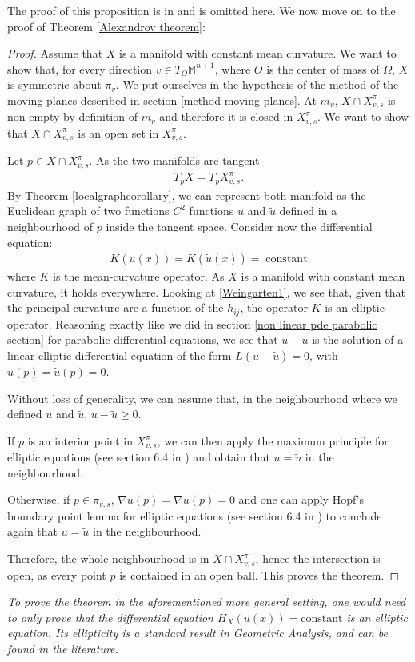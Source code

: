 The proof of this proposition is in \cite{italiani} and is omitted here. We now move on to the proof of Theorem \ref{Alexandrov theorem}:
\begin{proof}
	Assume that $X$ is a manifold with constant mean curvature. 
	We want to show that, for every direction $v\in T_O\mathbb{M}^{n+1}$, where $O$ is the center of mass of $\Omega$, $X$ is symmetric about $\pi_v$. We put ourselves in the hypothesis of the method of the moving planes described in section \ref{method moving planes}. At $m_v$, $X \cap X_{v, s}^\pi$ is non-empty by definition of $m_v$ and therefore it is closed in $X_{v, s}^\pi$. We want to show that  $X \cap X_{v, s}^\pi$ is an open set in $X_{v, s}^\pi$. 
	
	Let $p\in X\cap X_{v, s}^\pi$. As the two manifolds are tangent
	\begin{align*}
		T_p X=T_p X_{v, s}^\pi.
	\end{align*} By Theorem \ref{localgraphcorollary}, we can represent both manifold as the Euclidean graph of two functions $C^2$ functions $u$ and $\tilde{u}$ defined in a neighbourhood of $p$ inside the tangent space. Consider now the differential equation: 
	\begin{align*}
		K(u(x))=K(\tilde{u}(x))=\;\mathrm{constant} 
	\end{align*}
	where $K$ is the mean-curvature operator. As $X$ is a manifold with constant mean curvature, it holds everywhere. 
	Looking at \ref{Weingarten1}, we see that, given that the principal curvature are a function of the $h_{ij}$, the operator $K$ is an elliptic operator. Reasoning exactly like we did in section \ref{non linear pde parabolic section} for parabolic differential equations, we see that $u-\tilde{u}$ is the solution of a linear elliptic differential equation of the form $L (u-\tilde{u})=0$, with $u(p)=\tilde{u}(p)=0$. 
	
	Without loss of generality, we can assume that, in the neighbourhood where we defined $u$ and $\tilde{u}$, $u-\tilde{u}\geq 0$. 
	
	If $p$ is an interior point in $X_{v, s}^\pi$, we can then apply the maximum principle for elliptic equations (see section 6.4 in \cite{Evans}) and obtain that  $u=\tilde{u}$ in the neighbourhood. 
	
	Otherwise, if $p\in\pi_{v,s}$, $\nabla u (p)=\nabla \tilde{u} (p)=0$ and one can apply Hopf's boundary point lemma for elliptic equations (see section 6.4 in \cite{Evans}) to conclude again that $u=\tilde{u}$ in the neighbourhood.
	
	Therefore, the whole neighbourhood is in $X\cap X_{v, s}^\pi$, hence the intersection is open, as every point $p$ is contained in an open ball. This proves the theorem. 	
\end{proof}

\begin{oss}
	\em To prove the theorem in the aforementioned more general setting, one would need to only prove that the differential equation $H_X(u(x))= \mathrm{constant}$ is an elliptic equation. Its ellipticity is a standard result in Geometric Analysis, and can be found in the literature. 
\end{oss}